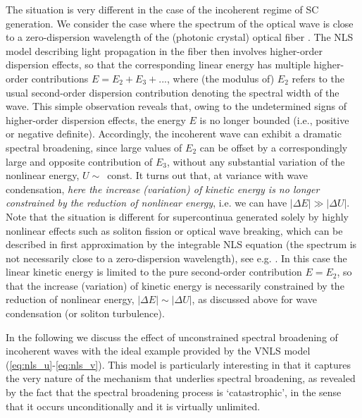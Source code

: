 \documentclass[pra,twocolumn,showpacs,preprintnumbers,amsmath,amssymb]{revtex4}
\begin{document}
The situation is very different in the case of the incoherent regime of SC generation. 
We consider the  case where the spectrum of the optical wave is close to a zero-dispersion wavelength of the (photonic crystal) optical fiber \cite{dudley06,skryabin10,dudley_book,agrawal}. 
The NLS model describing light propagation in the fiber then involves higher-order dispersion effects, so that the corresponding linear energy has multiple higher-order contributions $E=E_2+E_3 +...$, where (the modulus of) $E_2$ refers to the usual second-order dispersion contribution denoting the spectral width of the wave.
This simple observation reveals that, owing to the undetermined signs of higher-order dispersion effects, the energy $E$ is no longer bounded (i.e., positive or negative definite).
Accordingly, the incoherent wave can exhibit a dramatic spectral broadening, since large values of $E_2$ can be offset by a correspondingly large and opposite contribution of $E_3$, without any substantial variation of the nonlinear energy, $U \sim $~const.
It turns out that, at variance with wave condensation, {\it here the increase (variation) of kinetic energy is no longer constrained by the reduction of nonlinear energy}, i.e. we can have $|\Delta E| \gg |\Delta U|$.
Note that the situation is different for supercontinua generated solely by highly nonlinear effects such as soliton fission or optical wave breaking, which can be described in first approximation by the integrable NLS equation (the spectrum is not necessarily close to a zero-dispersion wavelength), see e.g. \cite{hydro_sc,silvestre,finot08}.
In this case the linear kinetic energy is limited to the pure second-order contribution $E=E_2$, so that the increase (variation) of kinetic energy is necessarily constrained by the reduction of nonlinear energy, $|\Delta E| \sim |\Delta U|$, as discussed above for wave condensation (or soliton turbulence).


In the following we discuss the effect of unconstrained spectral broadening of incoherent waves with the ideal example provided by the VNLS model (\ref{eq:nls_u}-\ref{eq:nls_v}). 
This model is particularly interesting in that it captures the very nature of the mechanism that underlies spectral broadening, as revealed by the fact that the spectral broadening process is `catastrophic', in the sense that it occurs unconditionally and it is virtually unlimited.
\end{document}
